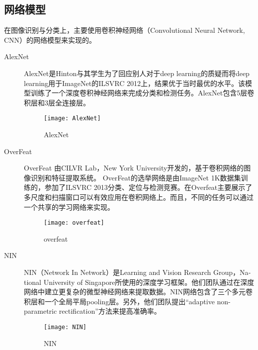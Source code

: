 \subsection{网络模型}
在图像识别与分类上，主要使用卷积神经网络（Convolutional Neural Network, CNN）的网络模型来实现的。
\begin{description}
\item [AlexNet] AlexNet\cite{krizhevsky2012imagenet}是Hinton与其学生为了回应别人对于deep learning的质疑而将deep learning用于ImageNet的ILSVRC 2012上，结果优于当时最优的水平。该模型训练了一个深度卷积神经网络来完成分类和检测任务。AlexNet包含5层卷积层和3层全连接层。
\begin{figure}[!ht]
\centering
\texttt{[image: AlexNet]}
\caption{AlexNet}
\end{figure}


\item[OverFeat] OverFeat\cite{sermanet2013overfeat}%
由CILVR Lab，New York University开发的，基于卷积网络的图像识别和特征提取系统。
OverFeat的选举网络是由ImageNet 1K数据集训练的，参加了ILSVRC 2013分类、定位与检测竞赛。在Overfeat主要展示了多尺度和扫描窗口可以有效应用在卷积网络上。而且，不同的任务可以通过一个共享的学习网络来实现。
\begin{figure}[!ht]
\centering
\texttt{[image: overfeat]}
\caption{overfeat}
\end{figure}

\item[NIN] NIN（Network In Network）\cite{Lin:2013aa}是Learn­ing and Vi­sion Re­search Group，Na­tion­al Uni­ver­si­ty of Sin­ga­pore所使用的深度学习框架。他们团队通过在深度网络中建立更复杂的微型神经网络来提取数据。NIN网络包含了三个多元卷积层和一个全局平局pooling层。另外，他们团队提出``adaptive non-parametric rectification''方法来提高准确率。 
\begin{figure}[!ht]
\centering
\texttt{[image: NIN]}
\caption{NIN}
\end{figure}


\end{description}
